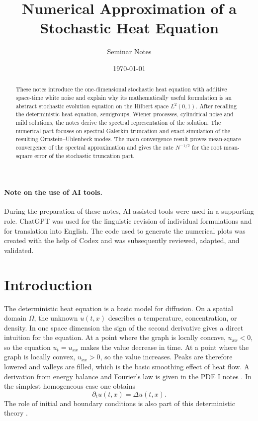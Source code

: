 \documentclass[11pt,a4paper]{article}
\title{Numerical Approximation of a Stochastic Heat Equation}
\author{Seminar Notes}
\date{\today}
\begin{document}
\maketitle

\begin{abstract}
These notes introduce the one-dimensional stochastic heat equation with additive
space-time white noise and explain why its mathematically useful formulation is
an abstract stochastic evolution equation on the Hilbert space \(L^2(0,1)\).
After recalling the deterministic heat equation, semigroups, Wiener processes,
cylindrical noise and mild solutions, the notes derive the spectral
representation of the solution. The numerical part focuses on spectral Galerkin
truncation and exact simulation of the resulting Ornstein--Uhlenbeck modes. The
main convergence result proves mean-square convergence of the spectral
approximation and gives the rate \(N^{-1/2}\) for the root mean-square error of
the stochastic truncation part.
\end{abstract}
\paragraph*{Note on the use of AI tools.}
During the preparation of these notes, AI-assisted tools were used in a
supporting role. ChatGPT was used for the linguistic revision of individual
formulations and for translation into English. The code used to generate the
numerical plots was created with the help of Codex and was subsequently
reviewed, adapted, and validated.

\tableofcontents

\section{Introduction}

The deterministic heat equation is a basic model for diffusion. On a spatial
domain \(\Omega\), the unknown \(u(t,x)\) describes a temperature, concentration,
or density. In one space dimension the sign of the second derivative gives a
direct intuition for the equation. At a point where the graph is locally
concave, \(u_{xx}<0\), so the equation \(u_t=u_{xx}\) makes the value decrease
in time. At a point where the graph is locally convex, \(u_{xx}>0\), so the
value increases. Peaks are therefore lowered and valleys are filled, which is
the basic smoothing effect of heat flow. A derivation from energy balance and
Fourier's law is given in the PDE I notes \cite{stinnerPDE1}. In the simplest
homogeneous case one obtains
\[
  \partial_t u(t,x)=\Delta u(t,x).
\]
The role of initial and boundary conditions is also part of this deterministic
theory \cite{stinnerPDE1}.
\end{document}
